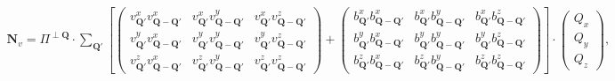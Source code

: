 \documentclass[a4paper,11pt]{article}
\begin{document}
\begin{eqnarray}
\mathbf{N}_v  = \Pi^{\perp\mathbf{Q}}\cdot\sum_{\mathbf{Q}'}
\left[
\left(\begin{array}{ccc}
v_{\mathbf{Q}'}^xv_{\mathbf{Q}-\mathbf{Q}'}^x & v_{\mathbf{Q}'}^xv_{\mathbf{Q}-\mathbf{Q}'}^y & v_{\mathbf{Q}'}^xv_{\mathbf{Q}-\mathbf{Q}'}^z \\
v_{\mathbf{Q}'}^yv_{\mathbf{Q}-\mathbf{Q}'}^x & v_{\mathbf{Q}'}^yv_{\mathbf{Q}-\mathbf{Q}'}^y & v_{\mathbf{Q}'}^yv_{\mathbf{Q}-\mathbf{Q}'}^z \\
v_{\mathbf{Q}'}^zv_{\mathbf{Q}-\mathbf{Q}'}^x & v_{\mathbf{Q}'}^zv_{\mathbf{Q}-\mathbf{Q}'}^y & v_{\mathbf{Q}'}^zv_{\mathbf{Q}-\mathbf{Q}'}^z
\end{array} \right)
+
\left(\begin{array}{ccc}
b_{\mathbf{Q}'}^xb_{\mathbf{Q}-\mathbf{Q}'}^x & b_{\mathbf{Q}'}^xb_{\mathbf{Q}-\mathbf{Q}'}^y & b_{\mathbf{Q}'}^xb_{\mathbf{Q}-\mathbf{Q}'}^z \\
b_{\mathbf{Q}'}^yb_{\mathbf{Q}-\mathbf{Q}'}^x & b_{\mathbf{Q}'}^yb_{\mathbf{Q}-\mathbf{Q}'}^y & b_{\mathbf{Q}'}^yb_{\mathbf{Q}-\mathbf{Q}'}^z \\
b_{\mathbf{Q}'}^zb_{\mathbf{Q}-\mathbf{Q}'}^x & b_{\mathbf{Q}'}^zb_{\mathbf{Q}-\mathbf{Q}'}^y & b_{\mathbf{Q}'}^zb_{\mathbf{Q}-\mathbf{Q}'}^z
\end{array} \right)
\right]
\cdot
\left(\begin{array}{c}
Q_x \\
Q_y \\
Q_z
\end{array} \right),
\end{eqnarray}
\end{document}
